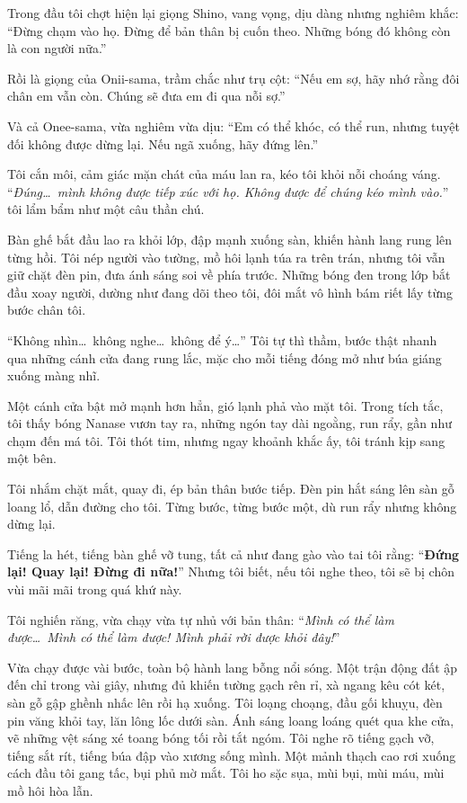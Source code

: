 \documentclass[../main.tex]{subfiles}
\begin{document}
Trong đầu tôi chợt hiện lại giọng Shino, vang vọng, dịu dàng nhưng nghiêm khắc: ``Đừng chạm vào họ. Đừng để bản thân bị cuốn theo. Những bóng đó không còn là con người nữa.''

Rồi là giọng của Onii-sama, trầm chắc như trụ cột: ``Nếu em sợ, hãy nhớ rằng đôi chân em vẫn còn. Chúng sẽ đưa em đi qua nỗi sợ.''

Và cả Onee-sama, vừa nghiêm vừa dịu: ``Em có thể khóc, có thể run, nhưng tuyệt đối không được dừng lại. Nếu ngã xuống, hãy đứng lên.''

Tôi cắn môi, cảm giác mặn chát của máu lan ra, kéo tôi khỏi nỗi choáng váng. ``\textit{Đúng\dots\ mình không được tiếp xúc với họ. Không được để chúng kéo mình vào.}'' tôi lẩm bẩm như một câu thần chú.

Bàn ghế bắt đầu lao ra khỏi lớp, đập mạnh xuống sàn, khiến hành lang rung lên từng hồi. Tôi nép người vào tường, mồ hôi lạnh túa ra trên trán, nhưng tôi vẫn giữ chặt đèn pin, đưa ánh sáng soi về phía trước. Những bóng đen trong lớp bắt đầu xoay người, dường như đang dõi theo tôi, đôi mắt vô hình bám riết lấy từng bước chân tôi.

``Không nhìn\dots\ không nghe\dots\ không để ý\dots'' Tôi tự thì thầm, bước thật nhanh qua những cánh cửa đang rung lắc, mặc cho mỗi tiếng đóng mở như búa giáng xuống màng nhĩ.

Một cánh cửa bật mở mạnh hơn hẳn, gió lạnh phả vào mặt tôi. Trong tích tắc, tôi thấy bóng Nanase vươn tay ra, những ngón tay dài ngoằng, run rẩy, gần như chạm đến má tôi. Tôi thót tim, nhưng ngay khoảnh khắc ấy, tôi tránh kịp sang một bên.

Tôi nhắm chặt mắt, quay đi, ép bản thân bước tiếp. Đèn pin hắt sáng lên sàn gỗ loang lổ, dẫn đường cho tôi. Từng bước, từng bước một, dù run rẩy nhưng không dừng lại.

Tiếng la hét, tiếng bàn ghế vỡ tung, tất cả như đang gào vào tai tôi rằng: ``\textbf{Đứng lại! Quay lại! Đừng đi nữa!}'' Nhưng tôi biết, nếu tôi nghe theo, tôi sẽ bị chôn vùi mãi mãi trong quá khứ này.

Tôi nghiến răng, vừa chạy vừa tự nhủ với bản thân: ``\textit{Mình có thể làm được\dots\ Mình có thể làm được! Mình phải rời được khỏi đây!}''

Vừa chạy được vài bước, toàn bộ hành lang bỗng nổi sóng. Một trận động đất ập đến chỉ trong vài giây, nhưng đủ khiến tường gạch rên rỉ, xà ngang kêu cót két, sàn gỗ gập ghềnh nhấc lên rồi hạ xuống. Tôi loạng choạng, đầu gối khuỵu, đèn pin văng khỏi tay, lăn lông lốc dưới sàn. Ánh sáng loang loáng quét qua khe cửa, vẽ những vệt sáng xé toang bóng tối rồi tắt ngóm. Tôi nghe rõ tiếng gạch vỡ, tiếng sắt rít, tiếng búa đập vào xương sống mình. Một mảnh thạch cao rơi xuống cách đầu tôi gang tấc, bụi phủ mờ mắt. Tôi ho sặc sụa, mùi bụi, mùi máu, mùi mồ hôi hòa lẫn.
\end{document}

